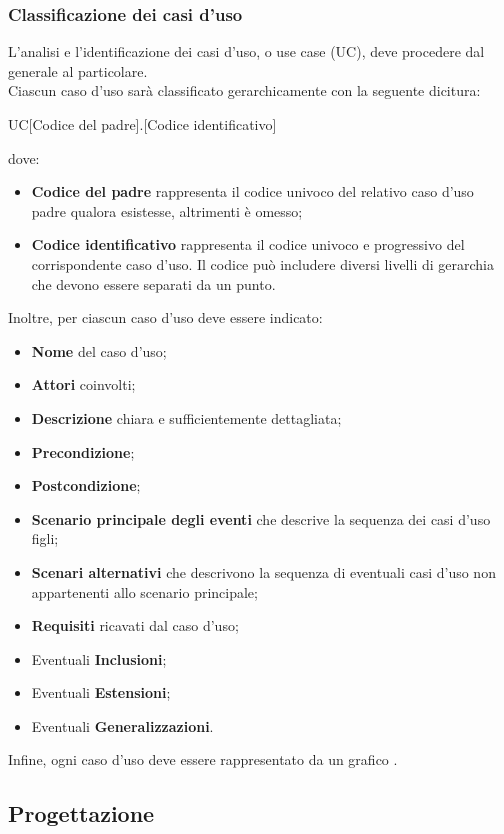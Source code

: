 \documentclass[../NormeDiProgetto.tex]{subfiles}
\begin{document}
			\subsubsection{Classificazione dei casi d'uso}
				L'analisi e l'identificazione dei casi d'uso, o use case (UC), deve
				procedere dal generale al particolare.\\
				Ciascun caso d'uso sarà classificato gerarchicamente con la seguente dicitura:
				\begin{center}
					UC[Codice del padre].[Codice identificativo]
				\end{center}
				dove:
				\begin{itemize}
					\item \textbf{Codice del padre} rappresenta il codice univoco
					del relativo caso d'uso padre qualora esistesse, altrimenti è omesso;
					\item \textbf{Codice identificativo} rappresenta il codice
					univoco e progressivo del corrispondente caso d'uso. Il codice
					può includere diversi livelli di gerarchia che devono essere
					separati da un punto.
				\end{itemize}
				Inoltre, per ciascun caso d'uso deve essere indicato:
				\begin{itemize}
					\item \textbf{Nome} del caso d'uso;
					\item \textbf{Attori} coinvolti;
					\item \textbf{Descrizione} chiara e sufficientemente
					dettagliata;
					\item \textbf{Precondizione};
					\item \textbf{Postcondizione};
					\item \textbf{Scenario principale degli eventi} che descrive
					la sequenza dei casi d'uso figli;
					\item \textbf{Scenari alternativi} che descrivono la sequenza
					di eventuali casi d'uso non appartenenti allo scenario
					principale;
					\item \textbf{Requisiti} ricavati dal caso d'uso;
					\item Eventuali \textbf{Inclusioni};
					\item Eventuali \textbf{Estensioni};
					\item Eventuali \textbf{Generalizzazioni}.
				\end{itemize}
				Infine, ogni caso d'uso deve essere rappresentato da un grafico .
		\subsection{Progettazione}
\end{document}
